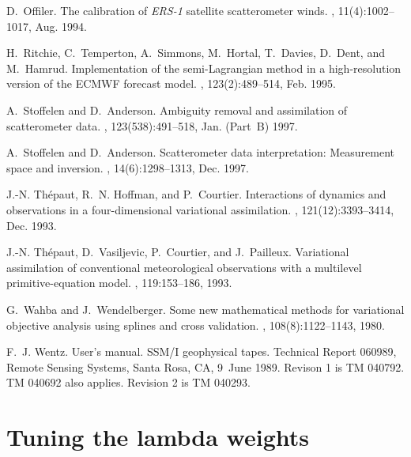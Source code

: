 \documentclass[11pt]{article}
\newcommand{\xx}[1]{\section {#1}}
\begin{document}
\begin{thebibliography}{10}
D.~Offiler.
\newblock The calibration of {{\em ERS-1}} satellite scatterometer winds.
, 11(4):1002--1017, Aug. 1994.

H.~Ritchie, C.~Temperton, A.~Simmons, M.~Hortal, T.~Davies, D.~Dent, and
  M.~Hamrud.
\newblock Implementation of the semi-{Lagrangian} method in a high-resolution
  version of the {ECMWF} forecast model.
, 123(2):489--514, Feb. 1995.

A.~Stoffelen and D.~Anderson.
\newblock Ambiguity removal and assimilation of scatterometer data.
, 123(538):491--518, Jan. (Part~B)
  1997.

A.~Stoffelen and D.~Anderson.
\newblock Scatterometer data interpretation: Measurement space and inversion.
, 14(6):1298--1313, Dec. 1997.

J.-N. Th{\'e}paut, R.~N. Hoffman, and P.~Courtier.
\newblock Interactions of dynamics and observations in a four-dimensional
  variational assimilation.
, 121(12):3393--3414, Dec. 1993.

J.-N. Th{\'e}paut, D.~Vasiljevic, P.~Courtier, and J.~Pailleux.
\newblock Variational assimilation of conventional meteorological observations
  with a multilevel primitive-equation model.
, 119:153--186, 1993.

G.~Wahba and J.~Wendelberger.
\newblock Some new mathematical methods for variational objective analysis
  using splines and cross validation.
, 108(8):1122--1143, 1980.

F.~J. Wentz.
\newblock User's manual. {SSM/I} geophysical tapes.
\newblock Technical Report 060989, Remote Sensing Systems, Santa Rosa, CA,
  9~June 1989.
\newblock Revison 1 is TM 040792. TM 040692 also applies. Revision 2 is TM
  040293.

\end{thebibliography}


\appendix

\xx { Tuning the lambda weights \label{lambda-tuning} }
\end{document}
